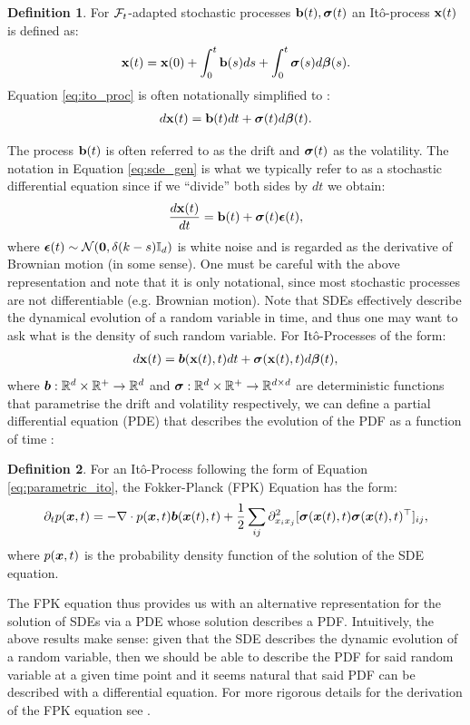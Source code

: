 \documentclass[a4paper,12pt,twoside,openright]{report}
\theoremstyle{definition}
\newtheorem{definition}{Definition}[section]
\begin{document}
\begin{definition}
    For ${\mathcal{F}}_t$-adapted stochastic processes ${\mathbf{b}}(t), {\bm{\sigma}}(t)$ an Itô-process ${\mathbf{x}}(t)$ is defined as:
    \begin{align}\label{eq:ito_proc}
    {\mathbf{x}}(t) = {\mathbf{x}}(0) + \int_{0}^t {\mathbf{b}}(s) ds + \int_0^t {\bm{\sigma}}(s) d{\bm{\beta}}(s).
    \end{align}
Equation \ref{eq:ito_proc} is often notationally simplified to :
    \begin{align}\label{eq:sde_gen}
        d{\mathbf{x}}(t) ={\mathbf{b}}(t) dt + {\bm{\sigma}}(t) d{\bm{\beta}}(t).
    \end{align}
\end{definition}
The process ${\mathbf{b}}(t)$ is often referred to as the drift and ${\bm{\sigma}}(t)$ as the volatility. The notation in Equation \ref{eq:sde_gen} is what we typically refer to as a stochastic differential equation since if we ``divide'' both sides by $dt$ we obtain:
\begin{align*}
    \frac{d {\mathbf{x}}(t)}{dt} = {\mathbf{b}}(t) + {\bm{\sigma}}(t) {\bm{\epsilon}}(t),
\end{align*}
where ${\bm{\epsilon}}(t) \sim {\mathcal{N}}({\bm{0}}, \delta(k-s){\mathbb{I}_d})$ is white noise and is regarded as the derivative of Brownian motion (in some sense). One must be careful with the above representation and note that it is only notational, since most stochastic processes are not differentiable (e.g. Brownian motion).
Note that SDEs effectively describe the dynamical evolution of a random variable in time, and thus one may want to ask what is the density of such random variable. For Itô-Processes of the form:
\begin{align}\label{eq:parametric_ito}
     d{\mathbf{x}}(t) ={\bm{b}}({\mathbf{x}}(t), t) dt + {\bm{\sigma}}({\mathbf{x}}(t), t) d{\bm{\beta}}(t),
\end{align}
where ${\bm{b}} : {\mathbb{R}}^d \times {\mathbb{R}}^{+} \rightarrow {\mathbb{R}}^d$ and ${\bm{\sigma}} : {\mathbb{R}}^d \times {\mathbb{R}}^{+} \rightarrow {\mathbb{R}}^{d\times d}$ are deterministic functions that parametrise the drift and volatility respectively, we can define a partial differential equation (PDE) that describes the evolution of the PDF as a function of time \citep{sarkka2019applied}:
\begin{definition}\label{def:fpk}
    For an Itô-Process following the form of Equation \ref{eq:parametric_ito}, the Fokker-Planck (FPK) Equation has the form:
    \begin{align}\label{eq:fpk}
        \partial_{t} p({\bm{x}}, t) =-\nabla \cdot p({\bm{x}}, t){\bm{b}}({\bm{x}}(t), t) + \frac{1}{2} \sum_{ij} \partial^2_{{x_i}{x_j}}[{\bm{\sigma}}({\bm{x}}(t), t){\bm{\sigma}}({\bm{x}}(t), t)^{\top}]_{ij},
    \end{align}
    where $p({\bm{x}}, t)$ is the probability density function of the solution of the SDE equation.
\end{definition}
The FPK equation thus provides us with an alternative representation for the solution of SDEs via a PDE whose solution describes a PDF. Intuitively, the above results make sense: given that the SDE describes the dynamic evolution of a random variable, then we should be able to describe the PDF for said random variable at a given time point and it seems natural that said PDF can be described with a differential equation. For more rigorous details for the derivation of the FPK equation see \cite{sarkka2019applied}.
\end{document}
